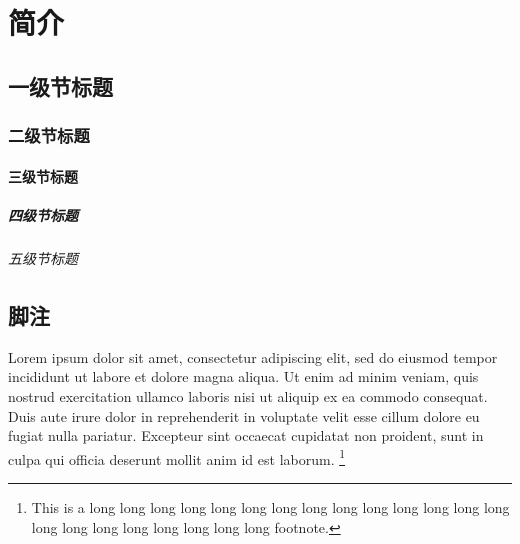 
\chapter{简介}

\section{一级节标题}

\subsection{二级节标题}

\subsubsection{三级节标题}

\paragraph{四级节标题}

\subparagraph{五级节标题}

\section{脚注}

Lorem ipsum dolor sit amet, consectetur adipiscing elit, sed do eiusmod tempor
incididunt ut labore et dolore magna aliqua. Ut enim ad minim veniam, quis
nostrud exercitation ullamco laboris nisi ut aliquip ex ea commodo consequat.
Duis aute irure dolor in reprehenderit in voluptate velit esse cillum dolore eu
fugiat nulla pariatur. Excepteur sint occaecat cupidatat non proident, sunt in
culpa qui officia deserunt mollit anim id est laborum.
\footnote{This is a long long long long long long long long long long long long
long long long long long long long long long long footnote.}
